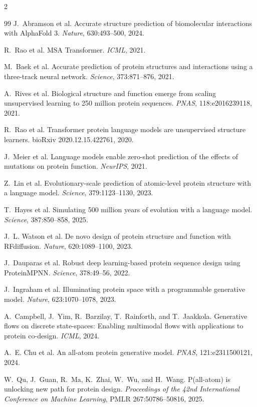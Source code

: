 \documentclass[10pt]{article}
\begin{document}
\begin{multicols}{2}
\begin{thebibliography}{99}
J.~Abramson et al.
\newblock Accurate structure prediction of biomolecular interactions with AlphaFold 3.
\newblock \emph{Nature}, 630:493--500, 2024.

R.~Rao et al.
\newblock MSA Transformer.
\newblock \emph{ICML}, 2021.

M.~Baek et al.
\newblock Accurate prediction of protein structures and interactions using a three-track neural
network.
\newblock \emph{Science}, 373:871--876, 2021.

A.~Rives et al.
\newblock Biological structure and function emerge from scaling unsupervised learning to 250
million protein sequences.
\newblock \emph{PNAS}, 118:e2016239118, 2021.

R.~Rao et al.
\newblock Transformer protein language models are unsupervised structure learners.
\newblock bioRxiv 2020.12.15.422761, 2020.

J.~Meier et al.
\newblock Language models enable zero-shot prediction of the effects of mutations on protein
function.
\newblock \emph{NeurIPS}, 2021.

Z.~Lin et al.
\newblock Evolutionary-scale prediction of atomic-level protein structure with a language model.
\newblock \emph{Science}, 379:1123--1130, 2023.

T.~Hayes et al.
\newblock Simulating 500 million years of evolution with a language model.
\newblock \emph{Science}, 387:850--858, 2025.

J.~L. Watson et al.
\newblock De novo design of protein structure and function with RFdiffusion.
\newblock \emph{Nature}, 620:1089--1100, 2023.

J.~Dauparas et al.
\newblock Robust deep learning-based protein sequence design using ProteinMPNN.
\newblock \emph{Science}, 378:49--56, 2022.

J.~Ingraham et al.
\newblock Illuminating protein space with a programmable generative model.
\newblock \emph{Nature}, 623:1070--1078, 2023.

A.~Campbell, J.~Yim, R.~Barzilay, T.~Rainforth, and T.~Jaakkola.
\newblock Generative flows on discrete state-spaces: Enabling multimodal flows with applications
to protein co-design.
\newblock \emph{ICML}, 2024.

A.~E. Chu et al.
\newblock An all-atom protein generative model.
\newblock \emph{PNAS}, 121:e2311500121, 2024.

W.~Qu, J.~Guan, R.~Ma, K.~Zhai, W.~Wu, and H.~Wang.
\newblock P(all-atom) is unlocking new path for protein design.
\newblock \emph{Proceedings of the 42nd International Conference on Machine Learning},
PMLR 267:50786--50816, 2025.

\end{thebibliography}
\end{multicols}
\end{document}
